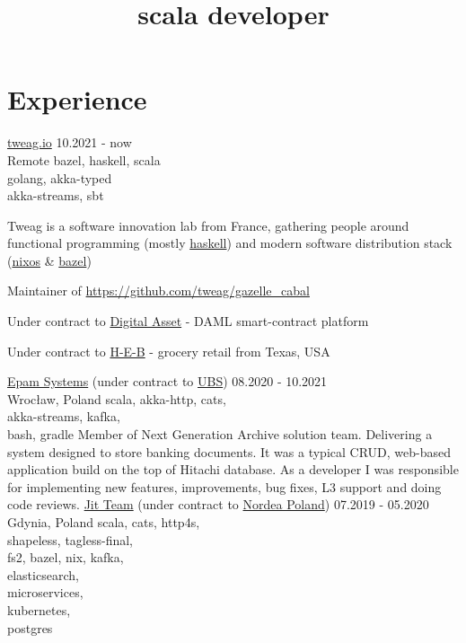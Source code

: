 \documentclass[a4paper,11pt]{cv4tw}%
\title{scala developer}
\begin{document}
\section{Experience}
      {\href{https://www.tweag.io}{tweag.io}}
      {10.2021 - now\\Remote}
      {bazel, haskell, scala\\golang, akka-typed\\akka-streams, sbt}
      { Tweag is a software innovation lab from France, gathering people around
        functional programming (mostly \href{https://www.haskell.org}{haskell}) and modern
        software distribution stack (\href{https://nixos.org}{nixos} \& \href{https://bazel.build}{bazel})
        \begin{missions}
          \item Maintainer of \href{https://github.com/tweag/gazelle_cabal}{https://github.com/tweag/gazelle\_cabal}
          \item Under contract to \href{https://www.digitalasset.com}{Digital Asset} - DAML smart-contract platform
          \item Under contract to \href{https://www.heb.com}{H-E-B} - grocery retail from Texas, USA
        \end{missions}
      }
      {\href{https://www.epam.com}{Epam Systems} (under contract to \href{https://www.ubs.com}{UBS})}
      {08.2020 - 10.2021\\Wrocław, Poland}
      {scala, akka-http, cats,\\akka-streams, kafka,\\bash, gradle}
      {Member of Next Generation Archive solution team. Delivering a system designed to store banking documents.
        It was a typical CRUD, web-based application build on the top of Hitachi database.
        As a developer I was responsible for implementing new features, improvements, bug fixes, L3 support and doing code reviews.
      }
      {\href{https://www.jit.team}{Jit Team} (under contract to \href{https://www.nordea.com}{Nordea Poland})}
      {07.2019 - 05.2020\\Gdynia, Poland}
      {scala, cats, http4s,\\shapeless, tagless-final,\\fs2, bazel, nix, kafka,\\elasticsearch,\\microservices,\\kubernetes,\\postgres
      }
\end{document}
